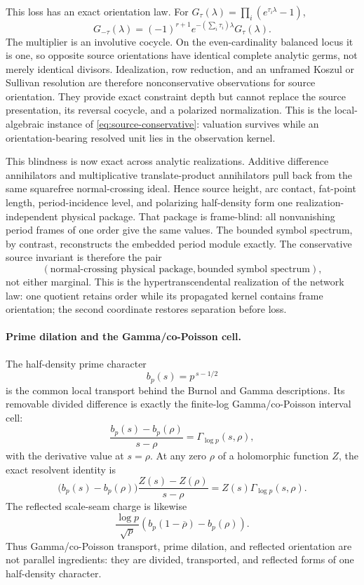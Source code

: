 \documentclass[11pt]{article}
\theoremstyle{definition}
\theoremstyle{remark}
\begin{document}
This loss has an exact orientation law.  For
\(G_\tau(\lambda)=\prod_i(e^{\tau_i\lambda}-1)\),
\[
 G_{-\tau}(\lambda)
   =(-1)^{r+1}e^{-(\sum_i\tau_i)\lambda}G_\tau(\lambda).
\tag{3.7j}\label{eq:source-reversal-cocycle}
\]
The multiplier is an involutive cocycle.  On the even-cardinality balanced
locus it is one, so opposite source orientations have identical complete
analytic germs, not merely identical divisors.  Idealization, row
reduction, and an unframed Koszul or Sullivan resolution are therefore
nonconservative observations for source orientation.  They provide exact
constraint depth but cannot replace the source presentation, its reversal
cocycle, and a polarized normalization.  This is the local-algebraic
instance of \eqref{eq:source-conservative}: valuation survives while an
orientation-bearing resolved unit lies in the observation kernel.

This blindness is now exact across analytic realizations.  Additive
difference annihilators and multiplicative translate-product annihilators
pull back from the same squarefree normal-crossing ideal.  Hence source
height, arc contact, fat-point length, period-incidence level, and
polarizing half-density form one realization-independent physical package.
That package is frame-blind: all nonvanishing period frames of one order
give the same values.  The bounded symbol spectrum, by contrast,
reconstructs the embedded period module exactly.  The conservative source
invariant is therefore the pair
\[
        (\text{normal-crossing physical package},
         \text{bounded symbol spectrum}),
\tag{3.7k}\label{eq:physical-package-symbol-pair}
\]
not either marginal.  This is the hypertranscendental realization of the
network law: one quotient retains order while its propagated kernel contains
frame orientation; the second coordinate restores separation before loss.

\paragraph{Prime dilation and the Gamma/co-Poisson cell.}
The half-density prime character
\[
                         b_p(s)=p^{\,s-1/2}
\]
is the common local transport behind the Burnol and Gamma descriptions.
Its removable divided difference is exactly the finite-log
Gamma/co-Poisson interval cell:
\[
 \frac{b_p(s)-b_p(\rho)}{s-\rho}
   =\Gamma_{\log p}(s,\rho),
\tag{3.8}\label{eq:prime-gamma-cell}
\]
with the derivative value at \(s=\rho\).  At any zero \(\rho\) of a
holomorphic function \(Z\), the exact resolvent identity is
\[
 \bigl(b_p(s)-b_p(\rho)\bigr)
       \frac{Z(s)-Z(\rho)}{s-\rho}
 =Z(s)\Gamma_{\log p}(s,\rho).
\tag{3.9}\label{eq:prime-resolvent}
\]
The reflected scale-seam charge is likewise
\[
 \frac{\log p}{\sqrt p}
 \left(b_p(1-\overline\rho)-b_p(\rho)\right).
\tag{3.10}\label{eq:prime-seam}
\]
Thus Gamma/co-Poisson transport, prime dilation, and reflected orientation
are not parallel ingredients: they are divided, transported, and reflected
forms of one half-density character.
\end{document}
